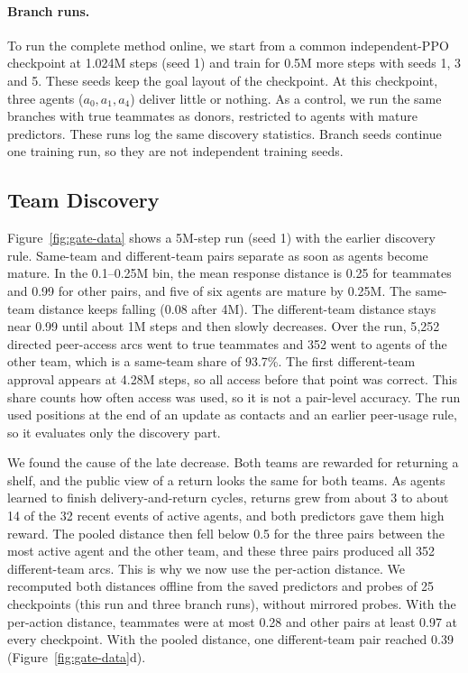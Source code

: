 \documentclass{article}
\begin{document}
\paragraph{Branch runs.} To run the complete method online, we start from a common independent-PPO checkpoint at 1.024M steps (seed 1) and train for 0.5M more steps with seeds 1, 3 and 5. These seeds keep the goal layout of the checkpoint. At this checkpoint, three agents ($a_0,a_1,a_4$) deliver little or nothing. As a control, we run the same branches with true teammates as donors, restricted to agents with mature predictors. These runs log the same discovery statistics. Branch seeds continue one training run, so they are not independent training seeds.

\subsection{Team Discovery}\label{sec:discovery}
Figure~\ref{fig:gate-data} shows a 5M-step run (seed 1) with the earlier discovery rule. Same-team and different-team pairs separate as soon as agents become mature. In the 0.1--0.25M bin, the mean response distance is 0.25 for teammates and 0.99 for other pairs, and five of six agents are mature by 0.25M. The same-team distance keeps falling (0.08 after 4M). The different-team distance stays near 0.99 until about 1M steps and then slowly decreases. Over the run, 5{,}252 directed peer-access arcs went to true teammates and 352 went to agents of the other team, which is a same-team share of 93.7\%. The first different-team approval appears at 4.28M steps, so all access before that point was correct. This share counts how often access was used, so it is not a pair-level accuracy. The run used positions at the end of an update as contacts and an earlier peer-usage rule, so it evaluates only the discovery part.

We found the cause of the late decrease. Both teams are rewarded for returning a shelf, and the public view of a return looks the same for both teams. As agents learned to finish delivery-and-return cycles, returns grew from about 3 to about 14 of the 32 recent events of active agents, and both predictors gave them high reward. The pooled distance then fell below 0.5 for the three pairs between the most active agent and the other team, and these three pairs produced all 352 different-team arcs. This is why we now use the per-action distance. We recomputed both distances offline from the saved predictors and probes of 25 checkpoints (this run and three branch runs), without mirrored probes. With the per-action distance, teammates were at most 0.28 and other pairs at least 0.97 at every checkpoint. With the pooled distance, one different-team pair reached 0.39 (Figure~\ref{fig:gate-data}d).
\end{document}
